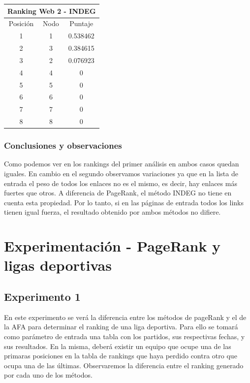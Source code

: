 \begin{center}
      			\begin{tabular}{c|c|c}
		      		\hline
		  				\multicolumn{3}{c}{Ranking Web 2 - INDEG} \\
		 			\hline
        			Posición & Nodo & Puntaje \\ \hline
         			1 & 1 & 0.538462 \\
        			2 & 3 & 0.384615 \\
        			3 & 2 & 0.076923 \\
        			4 & 4 & 0 \\
        			5 & 5 & 0 \\
        			6 & 6 & 0 \\
        			7 & 7 & 0 \\
        			8 & 8 & 0 \\
      			\end{tabular}
    	\end{center}

		\subsubsection*{Conclusiones y observaciones} 
		Como podemos ver en los rankings del primer análisis en ambos casos quedan iguales. En cambio en el segundo observamos variaciones ya que en la lista de entrada el peso de todos los enlaces no es el mismo, es decir, hay enlaces más fuertes que otros. A diferencia de PageRank, el método INDEG no tiene en cuenta esta propiedad. Por lo tanto, si en las páginas de entrada todos los links tienen igual fuerza, el resultado obtenido por ambos métodos no difiere. 

\section{Experimentación - PageRank y ligas deportivas}
	

	\subsection{Experimento 1}
	En este experimento se verá la diferencia entre los métodos de pageRank y el de la AFA para determinar el ranking de una liga deportiva. Para ello se tomará como parámetro de entrada una tabla con los partidos, sus respectivas fechas, y sus resultados. En la misma, deberá existir un equipo que ocupe una de las primaras posiciones en la tabla de rankings que haya perdido contra otro que ocupa una de las últimas. Observaremos la diferencia entre el ranking generado por cada uno de los métodos.
		

